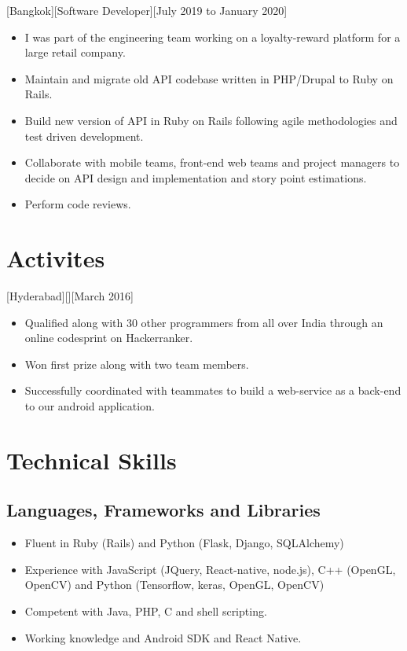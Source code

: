 \documentclass{article}
\begin{document}
[Bangkok][Software Developer][July 2019 to January 2020]

\begin{itemize}
    \item I was part of the engineering team working on a loyalty-reward platform for a large retail company.
    \item Maintain and migrate old API codebase written in PHP/Drupal to Ruby on Rails.
    \item Build new version of API in Ruby on Rails following agile methodologies and test driven development.
    \item Collaborate with mobile teams, front-end web teams and project managers to decide on API design and implementation and story point estimations.
    \item Perform code reviews.
\end{itemize}

\section{Activites}

[Hyderabad][][March 2016]
\begin{itemize}
\item Qualified along with 30 other programmers from all over India through an online codesprint on Hackerranker.
\item Won first prize along with two team members.
\item Successfully coordinated with teammates to build a web-service as a back-end to our android application.
\end{itemize}

\section{Technical Skills}
\subsection{Languages, Frameworks and Libraries}
\begin{itemize}
\item Fluent in Ruby (Rails) and Python (Flask, Django, SQLAlchemy)
\item Experience with JavaScript (JQuery, React-native, node.js), C++ (OpenGL, OpenCV) and Python (Tensorflow, keras, OpenGL, OpenCV)
\item Competent with Java, PHP, C and shell scripting.
\item Working knowledge and Android SDK and React Native.
\end{itemize}
\end{document}
